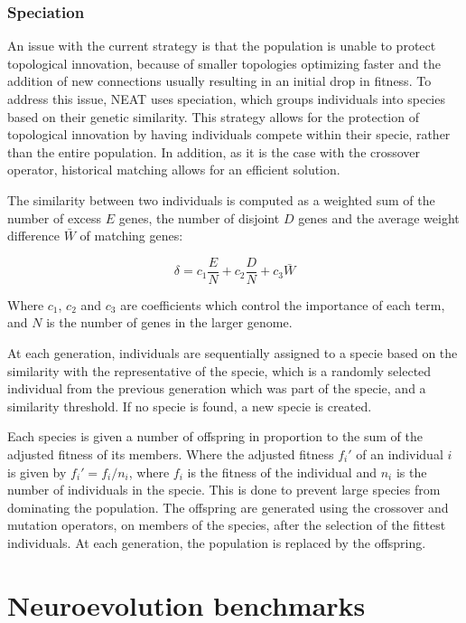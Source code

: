 
\subsubsection{Speciation}

An issue with the current strategy is that the population is unable to protect topological innovation, because of smaller topologies optimizing faster and the
addition of new connections usually resulting in an initial drop in fitness. To address this issue, NEAT uses speciation, which groups individuals into species based
on their genetic similarity. This strategy allows for the protection of topological innovation by having individuals compete within their specie, rather than the entire population.
In addition, as it is the case with the crossover operator, historical matching allows for an efficient solution.

The similarity between two individuals is computed as a weighted sum of the number of excess $E$ genes, the number of disjoint $D$ genes and the average weight difference $\bar{W}$
of matching genes:

\[
    \delta = c_1 \frac{E}{N} + c_2 \frac{D}{N} + c_3 \bar{W}
\]

Where $c_1$, $c_2$ and $c_3$ are coefficients which control the importance of each term, and $N$ is the number of genes in the larger genome.

At each generation, individuals are sequentially assigned to a specie based on the similarity with the representative of the specie, which is
a randomly selected individual from the previous generation which was part of the specie, and a similarity threshold. If no specie is found, a new specie is created.

Each species is given a number of offspring in proportion to the sum of the adjusted fitness of its members. Where the adjusted fitness $f_i'$ of an individual $i$ is
given by $f_i' = f_i / n_i$, where $f_i$ is the fitness of the individual and $n_i$ is the number of individuals in the specie. This is done to prevent large species
from dominating the population. The offspring are generated using the crossover and mutation operators, on members of the species, after the selection of the fittest
individuals. At each generation, the population is replaced by the offspring.

\section{Neuroevolution benchmarks}


